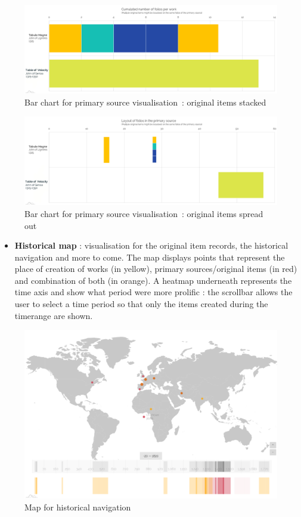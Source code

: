 \documentclass[a4paper,12pt,twoside]{book}
\begin{document}
\begin{figure}[H]
	\centering
	\includegraphics[width=16cm]{Images/Visualisations/Primary_source-Stacked.png}
	\caption{Bar chart for primary source visualisation~: original items stacked}
\end{figure}
\begin{figure}[H]
	\centering
	\includegraphics[width=16cm]{Images/Visualisations/Primary_source-Spread_out.png}
	\caption{Bar chart for primary source visualisation~: original items spread out}
\end{figure}

\begin{itemize}
	\item \textbf{Historical map} : visualisation for the original item records, the historical navigation and more to come. The map displays points that represent the place of creation of works (in yellow), primary sources/original items (in red) and combination of both (in orange). A heatmap underneath represents the time axis and show what period were more prolific : the scrollbar allows the user to select a time period so that only the items created during the timerange are shown.
\end{itemize}

\begin{figure}[H]
	\centering
	\includegraphics[width=16cm]{Images/Visualisations/Historical_navigation-All.png}
	\caption{Map for historical navigation}
\end{figure}
\end{document}
